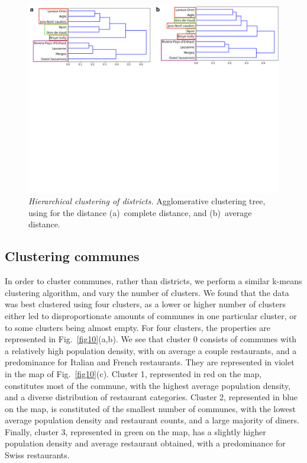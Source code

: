 \documentclass[12pt]{article}
\begin{document}
\begin{figure}
\begin{center}
\includegraphics[width=\textwidth]{Figures/Fig9}
\caption{\label{fig9} \emph{Hierarchical clustering of districts.} Agglomerative clustering tree, using for the distance (a)~complete distance, and (b)~average distance.}
\end{center}
\end{figure}

\subsection{Clustering communes}
\label{sec:resultsb}

In order to cluster communes, rather than districts, we perform a similar k-means clustering algorithm, and vary the number of clusters. We found that the data was best clustered using four clusters, as a lower or higher number of clusters either led to disproportionate amounts of communes in one particular cluster, or to some clusters being almost empty. For four clusters, the properties are represented in Fig.~\ref{fig10}(a,b). We see that cluster 0 consists of communes with a relatively high population density, with on average a couple restaurants, and a predominance for Italian and French restaurants. They are represented in violet in the map of Fig.~\ref{fig10}(c). Cluster 1, represented in red on the map, constitutes most of the commune, with the highest average population density, and a diverse distribution of restaurant categories. Cluster 2, represented in blue on the map, is constituted of the smallest number of communes, with the lowest average population density and restaurant counts, and a large majority of diners.  
Finally, cluster 3, represented in green on the map, has a slightly higher population density and average restaurant obtained, with a predominance for Swiss restaurants. 
\end{document}
